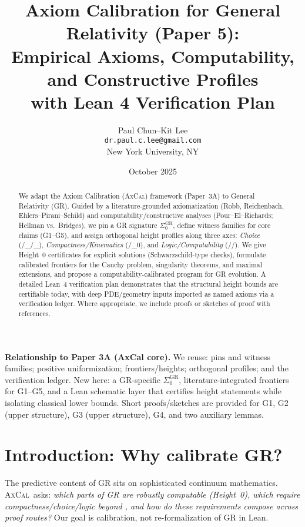 \documentclass[11pt]{article}
\title{Axiom Calibration for General Relativity (Paper 5):\\
Empirical Axioms, Computability, and Constructive Profiles\\
with Lean 4 Verification Plan}
\author{Paul Chun--Kit Lee\\
\texttt{dr.paul.c.lee@gmail.com}\\
New York University, NY}
\date{October 2025}
\theoremstyle{definition}
\theoremstyle{remark}
\newcommand{\BISH}{\mathsf{BISH}}
\newcommand{\WLPO}{\mathrm{WLPO}}
\newcommand{\LEM}{\mathrm{LEM}}
\newcommand{\FT}{\mathrm{FT}}
\newcommand{\WKLz}{\mathrm{WKL}_0}
\newcommand{\MP}{\mathrm{MP}}
\newcommand{\AC}{\mathrm{AC}}
\newcommand{\ACw}{\mathrm{AC}_\omega}
\newcommand{\DCw}{\mathrm{DC}_\omega}
\newcommand{\SigmaZero}{\Sigma_{0}}
\newcommand{\AxCal}{\textsc{AxCal}}
\begin{document}
\maketitle

\begin{abstract}
We adapt the Axiom Calibration (\AxCal) framework (Paper~3A) to General Relativity (GR). Guided by a literature-grounded axiomatization (Robb, Reichenbach, Ehlers--Pirani--Schild) and computability/constructive analyses (Pour--El--Richards; Hellman vs.\ Bridges), we pin a GR signature $\SigmaZero^{\mathrm{GR}}$, define witness families for core claims (G1--G5), and assign orthogonal height profiles along three axes: \emph{Choice} (\AC/\DCw/\ACw), \emph{Compactness/Kinematics} (\FT/\WKLz), and \emph{Logic/Computability} (\WLPO/\LEM/\MP). We give Height~0 certificates for explicit solutions (Schwarzschild-type checks), formulate calibrated frontiers for the Cauchy problem, singularity theorems, and maximal extensions, and propose a computability-calibrated program for GR evolution. A detailed Lean~4 verification plan demonstrates that the structural height bounds are certifiable today, with deep PDE/geometry inputs imported as named axioms via a verification ledger. Where appropriate, we include proofs or sketches of proof with references.
\end{abstract}

\begin{mdframed}[style=status]
\textbf{Relationship to Paper 3A (AxCal core).}
We reuse: pins and witness families; positive uniformization; frontiers/heights; orthogonal profiles; and the verification ledger. New here: a GR-specific $\SigmaZero^{\mathrm{GR}}$, literature-integrated frontiers for G1--G5, and a Lean schematic layer that certifies height statements while isolating classical lower bounds. Short proofs/sketches are provided for G1, G2 (upper structure), G3 (upper structure), G4, and two auxiliary lemmas.
\end{mdframed}

\tableofcontents

\section{Introduction: Why calibrate GR?}
The predictive content of GR sits on sophisticated continuum mathematics. \AxCal\ asks: \emph{which parts of GR are robustly computable (Height~0), which require compactness/choice/logic beyond \BISH, and how do these requirements compose across proof routes?} Our goal is calibration, not re-formalization of GR in Lean.
\end{document}
